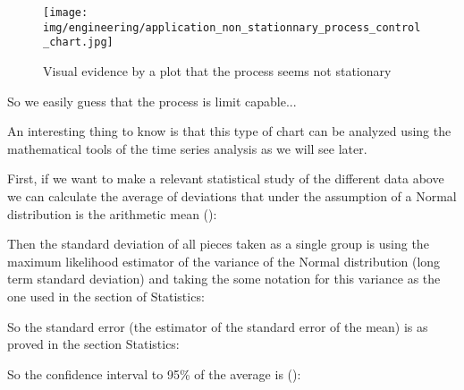 	\pagebreak
	\begin{tcolorbox}[colframe=black,colback=white,sharp corners]
	\begin{figure}[H]
		\centering
		\texttt{[image: img/engineering/application\_non\_stationnary\_process\_control\_chart.jpg]}
		\caption[]{Visual evidence by a plot that the process seems not stationary}
	\end{figure}
	So we easily guess that the process is limit capable...
	\begin{tcolorbox}[title=Remark,colframe=black,arc=10pt]
	An interesting thing to know is that this type of chart can be analyzed using the mathematical tools of the time series analysis as we will see later.
	\end{tcolorbox}
	First, if we want to make a relevant statistical study of the different data above we can calculate the average of deviations that under the assumption of a Normal distribution is the arithmetic mean ():
	
	Then the standard deviation of all pieces taken as a single group is using the maximum likelihood estimator of the variance of the Normal distribution (long term standard deviation) and taking the some notation for this variance as the one used in the section of Statistics:
	
	So the standard error  (the estimator of the standard error of the mean)  is as proved in the section Statistics:
	
	So the confidence interval to 95\% of the average is ():
	
	\end{tcolorbox}
	
